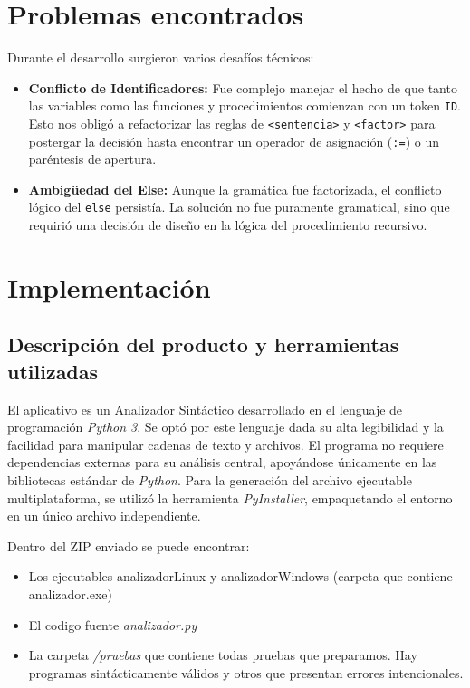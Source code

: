 \documentclass[12pt]{article}
\begin{document}
\section{Problemas encontrados}
Durante el desarrollo surgieron varios desafíos técnicos:
\begin{itemize}
    \item \textbf{Conflicto de Identificadores:} Fue complejo manejar el hecho de que tanto las variables como las funciones y procedimientos comienzan con un token \texttt{ID}. Esto nos obligó a refactorizar las reglas de \texttt{<sentencia>} y \texttt{<factor>} para postergar la decisión hasta encontrar un operador de asignación (\texttt{:=}) o un paréntesis de apertura.
    
    \item \textbf{Ambigüedad del Else:} Aunque la gramática fue factorizada, el conflicto lógico del \texttt{else} persistía. La solución no fue puramente gramatical, sino que requirió una decisión de diseño en la lógica del procedimiento recursivo.
\end{itemize}


\section{Implementación}

\subsection{Descripción del producto y herramientas utilizadas}

El aplicativo es un Analizador Sintáctico desarrollado en el lenguaje de programación \textit{Python 3}. Se optó por este lenguaje dada su alta legibilidad y la facilidad para manipular cadenas de texto y archivos. El programa no requiere dependencias externas para su análisis central, apoyándose únicamente en las bibliotecas estándar de \textit{Python}. Para la generación del archivo ejecutable multiplataforma, se utilizó la herramienta \textit{PyInstaller}, empaquetando el entorno en un único archivo independiente.

Dentro del ZIP enviado se puede encontrar:

\begin{itemize}
    \item Los ejecutables analizadorLinux y analizadorWindows (carpeta que contiene analizador.exe) 
    \item El codigo fuente \textit{analizador.py}
    \item La carpeta \textit{/pruebas} que contiene todas pruebas que preparamos. Hay programas sintácticamente válidos y otros que presentan errores intencionales.
\end{itemize}
\end{document}
